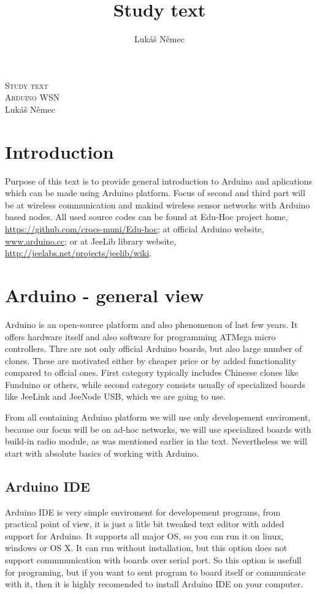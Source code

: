 \documentclass[12pt,titlepage]{article}
\title{Study text}
\author{Lukáš Němec}
\begin{document}
\begin{titlepage}
\begin{center}
\textsc{\LARGE Study text}\\[1cm]
\textsc{\Large Arduino WSN}\\[0.6cm]


\Large{Lukáš Němec}\\[1cm]

\bigskip
\bigskip

\end{center}
\end{titlepage}



\tableofcontents
\newpage
\section{Introduction}

Purpose of this text is to provide general introduction to Arduino and aplications which can be made using Arduino platform. Focus of second and third part will be at wireless communication and makind wireless sensor networks with Arduino based nodes. All used source codes can be found at Edu-Hoc project home, \url{https://github.com/crocs-muni/Edu-hoc}; at official Arduino website, \url{www.arduino.cc}; or at JeeLib library website, \url{http://jeelabs.net/projects/jeelib/wiki}.

\section{Arduino - general view}
Arduino is an open-source platform and also phenomenon of last few years. It offers hardware itself and also software for programming ATMega micro controllers. Thre are not only official Arduino boards, but also large number of clones. These are motivated either by cheaper price or by added functionality compared to offcial ones. First category  typically includes Chinesse clones like Funduino or others, while second category consists usually of specialized boards like JeeLink and JeeNode USB, which we are going to use.

From all containing Arduino platform we will use only developement enviroment, because our focus will be on ad-hoc networks, we will use specialized boards with build-in radio module, as was mentioned earlier in the text. Nevertheless we will start with absolute basics of working with Arduino.

	\subsection{Arduino IDE}
	Arduino IDE is very simple enviroment for developement programs, from practical point of view, it is just a litle bit tweaked text editor with added support for Arduino.
	It supports all major OS, so you can run it on linux, windows or OS X. It can run without installation, but this option does not support commmunication with boards over serial port. So this option is usefull for programing, but if you want to sent program to board itself or communicate with it, then it is highly recomended to install Arduino IDE on your computer.
\end{document}
